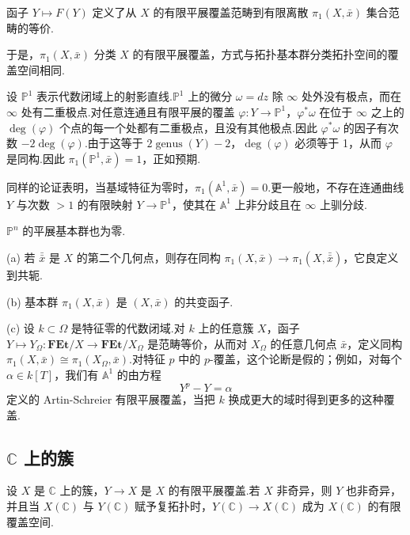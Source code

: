 \begin{theorem}\label{thm:3.1}
函子 $Y \mapsto F(Y)$ 定义了从 $X$ 的有限平展覆盖范畴到有限离散 $\pi_1(X, \bar{x})$ 集合范畴的等价.
\end{theorem}

于是，$\pi_1(X, \bar{x})$ 分类 $X$ 的有限平展覆盖，方式与拓扑基本群分类拓扑空间的覆盖空间相同.

\begin{example}\label{ex:3.2}
设 $\mathbb{P}^{1}$ 表示代数闭域上的射影直线.$\mathbb{P}^{1}$ 上的微分 $\omega = dz$ 除 $\infty$ 处外没有极点，而在 $\infty$ 处有二重极点.对任意连通且有限平展的覆盖 $\varphi \colon Y \to \mathbb{P}^{1}$，$\varphi^{*}\omega$ 在位于 $\infty$ 之上的 $\deg(\varphi)$ 个点的每一个处都有二重极点，且没有其他极点.因此 $\varphi^{*}\omega$ 的因子有次数 $-2\deg(\varphi)$.由于这等于 $2\operatorname{genus}(Y) - 2$，$\deg(\varphi)$ 必须等于 1，从而 $\varphi$ 是同构.因此 $\pi_1(\mathbb{P}^{1}, \bar{x}) = 1$，正如预期.

同样的论证表明，当基域特征为零时，$\pi_1(\mathbb{A}^{1}, \bar{x}) = 0$.更一般地，不存在连通曲线 $Y$ 与次数 $> 1$ 的有限映射 $Y \to \mathbb{P}^{1}$，使其在 $\mathbb{A}^{1}$ 上非分歧且在 $\infty$ 上驯分歧.

$\mathbb{P}^{n}$ 的平展基本群也为零.
\end{example}

\begin{remark}\label{rem:3.3}
(a) 若 $\bar{\bar{x}}$ 是 $X$ 的第二个几何点，则存在同构 $\pi_1(X, \bar{x}) \to \pi_1(X, \bar{\bar{x}})$，它良定义到共轭.

(b) 基本群 $\pi_1(X, \bar{x})$ 是 $(X, \bar{x})$ 的共变函子.

(c) 设 $k \subset \Omega$ 是特征零的代数闭域.对 $k$ 上的任意簇 $X$，函子 $Y \mapsto Y_{\Omega} \colon \mathbf{FEt}/X \to \mathbf{FEt}/X_{\Omega}$ 是范畴等价，从而对 $X_{\Omega}$ 的任意几何点 $\bar{x}$，定义同构 $\pi_1(X, \bar{x}) \cong \pi_1(X_{\Omega}, \bar{x})$.对特征 $p$ 中的 $p$-覆盖，这个论断是假的；例如，对每个 $\alpha \in k[T]$，我们有 $\mathbb{A}^{1}$ 的由方程
\[
Y^{p} - Y = \alpha
\]
定义的 Artin-Schreier 有限平展覆盖，当把 $k$ 换成更大的域时得到更多的这种覆盖.
\end{remark}

\subsection*{\texorpdfstring{$\mathbb{C}$ 上的簇}{C 上的簇}}

设 $X$ 是 $\mathbb{C}$ 上的簇，$Y \to X$ 是 $X$ 的有限平展覆盖.若 $X$ 非奇异，则 $Y$ 也非奇异，并且当 $X(\mathbb{C})$ 与 $Y(\mathbb{C})$ 赋予复拓扑时，$Y(\mathbb{C}) \to X(\mathbb{C})$ 成为 $X(\mathbb{C})$ 的有限覆盖空间.

